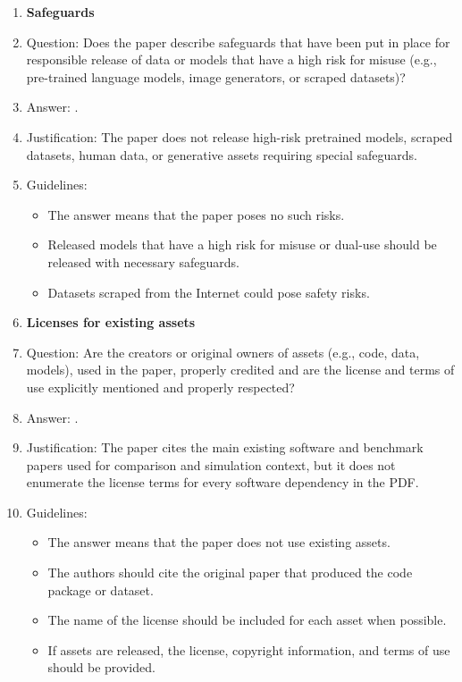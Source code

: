 \begin{enumerate}
\item {\bf Safeguards}
    \item[] Question: Does the paper describe safeguards that have been put in place for responsible release of data or models that have a high risk for misuse (e.g., pre-trained language models, image generators, or scraped datasets)?
    \item[] Answer: \answerNA{}.
    \item[] Justification: The paper does not release high-risk pretrained models, scraped datasets, human data, or generative assets requiring special safeguards.
    \item[] Guidelines:
    \begin{itemize}
        \item The answer \answerNA{} means that the paper poses no such risks.
        \item Released models that have a high risk for misuse or dual-use should be released with necessary safeguards.
        \item Datasets scraped from the Internet could pose safety risks.
    \end{itemize}

\item {\bf Licenses for existing assets}
    \item[] Question: Are the creators or original owners of assets (e.g., code, data, models), used in the paper, properly credited and are the license and terms of use explicitly mentioned and properly respected?
    \item[] Answer: \answerNo{}.
    \item[] Justification: The paper cites the main existing software and benchmark papers used for comparison and simulation context, but it does not enumerate the license terms for every software dependency in the PDF.
    \item[] Guidelines:
    \begin{itemize}
        \item The answer \answerNA{} means that the paper does not use existing assets.
        \item The authors should cite the original paper that produced the code package or dataset.
        \item The name of the license should be included for each asset when possible.
        \item If assets are released, the license, copyright information, and terms of use should be provided.
    \end{itemize}


\end{enumerate}
